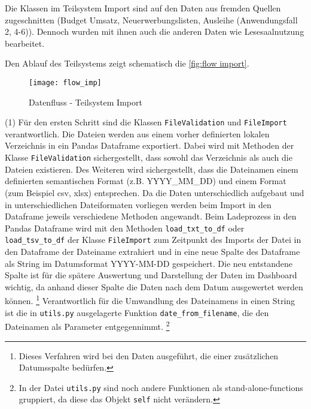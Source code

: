     Die Klassen im Teilsystem Import sind auf den Daten aus fremden Quellen zugeschnitten
    (Budget Umsatz, Neuerwerbungslisten, Ausleihe (Anwendungsfall 2, 4-6)). Dennoch wurden mit ihnen auch die anderen Daten
    wie Lesesaalnutzung bearbeitet. 

    Den Ablauf des Teilsystems zeigt schematisch die \autoref{fig:flow import}.

    \begin{figure}[H]
        \centering
            \texttt{[image: flow\_imp]}
            \caption{Datenfluss - Teilsystem Import}
            \label{fig:flow import}
    \end{figure}

    
    (1) Für den ersten Schritt sind die Klassen \texttt{FileValidation} und \texttt{FileImport} verantwortlich.
    Die Dateien werden aus einem vorher definierten lokalen Verzeichnis in ein Pandas Dataframe exportiert. 
    Dabei wird mit Methoden der Klasse \texttt{FileValidation} sichergestellt, dass sowohl das Verzeichnis als auch die Dateien existieren. 
    Des Weiteren wird sichergestellt, dass die Dateinamen einem definierten semantischen Format (z.B. YYYY\_MM\_DD) und 
    einem Format (zum Beispiel csv, xlsx) entsprechen. Da die Daten unterschiedlich aufgebaut und in unterschiedlichen Dateiformaten vorliegen 
    werden beim Import in den Dataframe jeweils verschiedene Methoden angewandt.
    Beim Ladeprozess in den Pandas Dataframe wird mit den Methoden \texttt{load\_txt\_to\_df} oder \texttt{load\_tsv\_to\_df} der Klasse \texttt{FileImport} 
    zum Zeitpunkt des Imports der Datei in den Dataframe der Dateiname extrahiert und in eine neue Spalte des Dataframe als String 
    im Datumsformat YYYY-MM-DD gespeichert. Die neu entstandene Spalte ist für die spätere Auswertung und Darstellung der Daten im Dashboard wichtig, 
    da anhand dieser Spalte die Daten nach dem Datum ausgewertet werden können.
    \footnote{Dieses Verfahren wird bei den Daten ausgeführt, die einer zusätzlichen Datumsspalte bedürfen.} 
    Verantwortlich für die Umwandlung des Dateinamens in einen String ist die in \texttt{utils.py} ausgelagerte Funktion \texttt{date\_from\_filename},
    die den Dateinamen als Parameter entgegennimmt.
    \footnote{In der Datei \texttt{utils.py} sind noch andere Funktionen als stand-alone-functions gruppiert, da diese das Objekt \texttt{self} nicht verändern.} 
    
